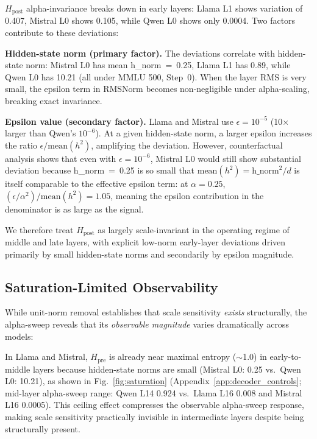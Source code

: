 \documentclass{ieeeaccess}
\newcommand{\Hpre}{H_{\text{pre}}}
\newcommand{\Hpost}{H_{\text{post}}}
\begin{document}
$\Hpost$ alpha-invariance breaks down in early layers: Llama L1 shows variation of 0.407, Mistral L0 shows 0.105, while Qwen L0 shows only 0.0004. Two factors contribute to these deviations:

\textbf{Hidden-state norm (primary factor).} The deviations correlate with hidden-state norm: Mistral L0 has mean h\_norm~=~0.25, Llama L1 has 0.89, while Qwen L0 has 10.21 (all under MMLU 500, Step~0). When the layer RMS is very small, the epsilon term in RMSNorm becomes non-negligible under alpha-scaling, breaking exact invariance.

\textbf{Epsilon value (secondary factor).} Llama and Mistral use $\epsilon = 10^{-5}$ (10$\times$ larger than Qwen's $10^{-6}$). At a given hidden-state norm, a larger epsilon increases the ratio $\epsilon/\text{mean}(h^2)$, amplifying the deviation. However, counterfactual analysis shows that even with $\epsilon = 10^{-6}$, Mistral L0 would still show substantial deviation because h\_norm~=~0.25 is so small that $\text{mean}(h^2) = \text{h\_norm}^2/d$ is itself comparable to the effective epsilon term: at $\alpha = 0.25$, $(\epsilon/\alpha^2)/\text{mean}(h^2) = 1.05$, meaning the epsilon contribution in the denominator is as large as the signal.

We therefore treat $\Hpost$ as largely scale-invariant in the operating regime of middle and late layers, with explicit low-norm early-layer deviations driven primarily by small hidden-state norms and secondarily by epsilon magnitude.

\subsection{Saturation-Limited Observability}
\label{sec:saturation}

While unit-norm removal establishes that scale sensitivity \textit{exists} structurally, the alpha-sweep reveals that its \textit{observable magnitude} varies dramatically across models:

In Llama and Mistral, $\Hpre$ is already near maximal entropy ($\sim$1.0) in early-to-middle layers because hidden-state norms are small (Mistral L0: 0.25 vs.\ Qwen L0: 10.21), as shown in Fig.~\ref{fig:saturation} (Appendix~\ref{app:decoder_controls}; mid-layer alpha-sweep range: Qwen L14 0.924 vs.\ Llama L16 0.008 and Mistral L16 0.0005). This ceiling effect compresses the observable alpha-sweep response, making scale sensitivity practically invisible in intermediate layers despite being structurally present.
\end{document}
